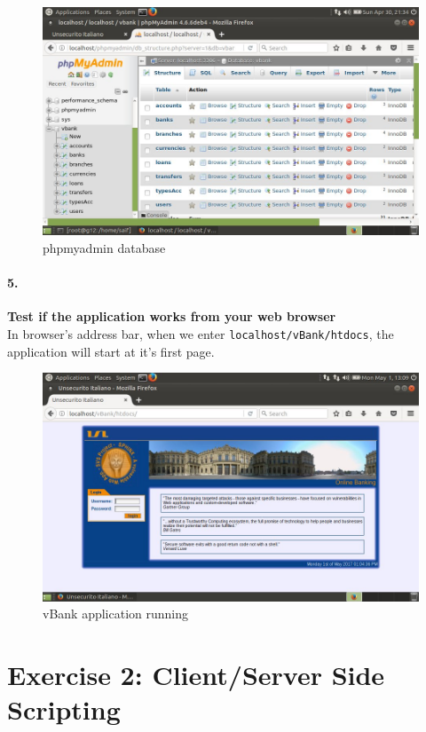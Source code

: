 \documentclass[12pt]{report}
\begin{document}
	\begin{figure}[H]
		\includegraphics[width=0.75\textheight,height=0.35\textheight]{images/phpmyadmin.jpg}
		\caption{phpmyadmin database}
	\end{figure}
	
	\paragraph*{5.} {\bf Test if the application works from your web browser}\\
	In browser's address bar, when we enter {\tt localhost/vBank/htdocs}, the application will start at it's first page.
	\begin{figure}[H]
		\includegraphics[width=0.75\textheight]{images/apprunning.jpg}
		\caption{vBank application running}
	\end{figure}	
	
	
	\newpage
	
	\section*{Exercise 2: Client/Server Side Scripting}
	
\end{document}
